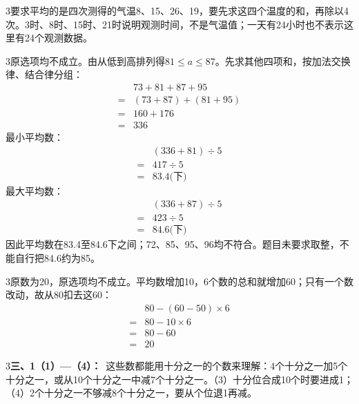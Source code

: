 \documentclass[multi=snippet,border={5bp 20bp 5bp 5bp}]{standalone}
\newenvironment{snippet}[3]{\begin{minipage}{#1bp}\color{answerred}\fontsize{#2}{#3}\selectfont\raggedright}{\end{minipage}}
\begin{document}
\begin{snippet}{505}{11.5}{14}\begin{multicols}{3}\raggedcolumns 要求平均的是四次测得的气温8、15、26、19，要先求这四个温度的和，再除以4次。3时、8时、15时、21时说明观测时间，不是气温值；一天有24小时也不表示这里有24个观测数据。\end{multicols}\end{snippet}
\begin{snippet}{505}{11.5}{14}\begin{multicols}{3}\raggedcolumns 原选项均不成立。由从低到高排列得\(81\le a\le87\)\allowbreak 。先求其他四项和，按加法交换律、结合律分组：\[\begin{aligned}&73+81+87+95\\={}&(73+87)+(81+95)\\={}&160+176\\={}&336\end{aligned}\]最小平均数：\[\begin{aligned}&(336+81)\div5\\={}&417\div5\\={}&83.4\text{(下)}\end{aligned}\]最大平均数：\[\begin{aligned}&(336+87)\div5\\={}&423\div5\\={}&84.6\text{(下)}\end{aligned}\]因此平均数在83.4至84.6下之间；72、85、95、96均不符合。题目未要求取整，不能自行把84.6约为85。\end{multicols}\end{snippet}
\begin{snippet}{505}{11.5}{14}\begin{multicols}{3}\raggedcolumns 原数为20，原选项均不成立。平均数增加10，6个数的总和就增加60；只有一个数改动，故从80扣去这60：\[\begin{aligned}&80-(60-50)\times6\\={}&80-10\times6\\={}&80-60\\={}&20\end{aligned}\]\end{multicols}\end{snippet}
\begin{snippet}{505}{11.5}{14}\begin{multicols}{3}\raggedcolumns \textbf{三、1（1）—（4）：}\ 这些数都能用十分之一的个数来理解：4个十分之一加5个十分之一，或从10个十分之一中减7个十分之一。（3）十分位合成10个时要进成1；（4）2个十分之一不够减8个十分之一，要从个位退1再减。\end{multicols}\end{snippet}
\end{document}
